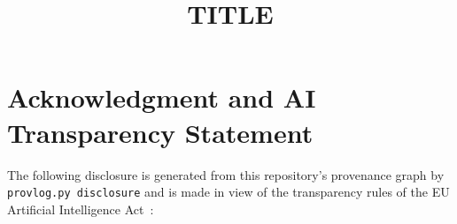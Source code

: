 \documentclass[conference]{IEEEtran}
\begin{document}
\title{{{TITLE}}}

\author{
}

\maketitle

\begin{abstract}
\end{abstract}








\section*{Acknowledgment and AI Transparency Statement}
The following disclosure is generated from this repository's provenance
graph by \texttt{provlog.py disclosure} and is made in view of the
transparency rules of the EU Artificial Intelligence
Act~\cite{eu-ai-act2024}:

\begingroup\itshape

\endgroup



\end{document}
